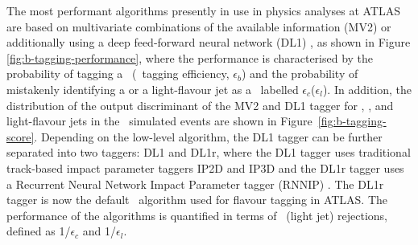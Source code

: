\documentclass[letterpaper,12pt]{article}
\begin{document}
The most performant algorithms presently in use in physics 
analyses at ATLAS are based on multivariate combinations 
of the available information (MV2) or additionally using a
deep feed-forward neural network (DL1) \cite{tagging,ATL-PHYS-PUB-2017-013}, 
as shown in Figure \ref{fig:b-tagging-performance}, where the performance
is characterised by the probability of 
tagging a \bjet\ (\bjet\ tagging efficiency, 
$\epsilon_b$) and the probability of mistakenly identifying 
a \cjet or a light-flavour jet as a \bjet\, 
labelled $\epsilon_c$($\epsilon_l$). 
In addition, the distribution of the output discriminant
of the MV2 and DL1 tagger for \bjet, \cjet, and light-flavour jets
in the \ttbar\ simulated events are shown in Figure~\ref{fig:b-tagging-score}.
Depending on the low-level algorithm, 
the DL1 tagger can be further separated into two taggers: DL1 and DL1r,
 where the DL1 tagger uses traditional track-based impact parameter 
 taggers IP2D and IP3D \cite{ATL-PHYS-PUB-2016-012} 
 and the DL1r tagger uses a Recurrent Neural Network Impact Parameter tagger 
 (RNNIP) \cite{ATL-PHYS-PUB-2017-013}. The DL1r tagger is now the 
 default \btagging\ algorithm used for flavour tagging in ATLAS.
 The performance of the algorithms is quantified 
in terms of \cjet\ (light jet) rejections, defined as 
1/$\epsilon_c$ and 1/$\epsilon_l$. 
\end{document}
